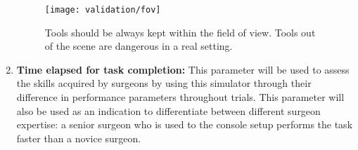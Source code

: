\begin{enumerate}[start=1,label={Para \#\arabic*, }]
  \begin{figure}
    \centering
    \texttt{[image: validation/fov]}
    \caption{Tools should be always kept within the field of view. Tools out of the scene are dangerous in a real setting.}\label{fig:fov}
  \end{figure}
	\item \textbf{Time elapsed for task completion:} This parameter will be used to assess the skills acquired by surgeons by using this simulator through their difference in performance parameters throughout trials. This parameter will also be used as an indication to differentiate between different surgeon expertise: a senior surgeon who is used to the console setup performs the task faster than a novice surgeon.
\end{enumerate}

